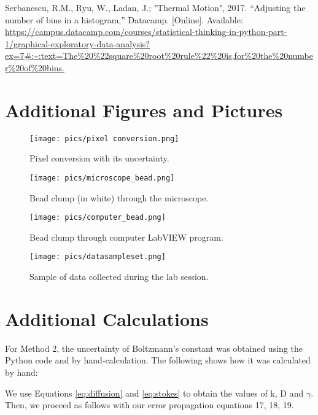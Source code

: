 \documentclass[12pt, letterpaper, twoside]{article}
\begin{document}
\vfill\pagebreak

\appendix

\begin{thebibliography}{14}

 Serbanescu, R.M., Ryu, W., Ladan, J.; "Thermal Motion", 2017.
 “Adjusting the number of bins in a histogram,” Datacamp. [Online]. Available: \url{https://campus.datacamp.com/courses/statistical-thinking-in-python-part-1/graphical-exploratory-data-analysis?ex=7#:~:text=The\%20\%22square\%20root\%20rule\%22\%20is,for\%20the\%20number\%20of\%20bins.}
\end{thebibliography}

\section{Additional Figures and Pictures}\label{sec:extrapics}

\begin{figure}[!ht]
    \centering
    \texttt{[image: pics/pixel conversion.png]}
    \caption{Pixel conversion with its uncertainty.}
    \label{fig:pixelconv}
\end{figure}

\begin{figure}[!ht]
    \centering
    \texttt{[image: pics/microscope\_bead.png]}
    \caption{Bead clump (in white) through the microscope.}
\end{figure}

\begin{figure}[!ht]
    \centering
    \texttt{[image: pics/computer\_bead.png]}
    \caption{Bead clump through computer LabVIEW program.}
\end{figure}

\begin{figure}[!ht]
    \centering
    \texttt{[image: pics/datasampleset.png]}
    \caption{Sample of data collected during the lab session.}
    \label{fig:my_label}
\end{figure}

\section{Additional Calculations}

For Method 2, the uncertainty of Boltzmann's constant was obtained using the Python code and by hand-calculation. The following shows how it was calculated by hand:

We use Equations \ref{eq:diffusion} and \ref{eq:stokes} to obtain the values of k, D and $\gamma$. Then, we proceed as follows with our error propagation equations 17, 18, 19.
\end{document}
